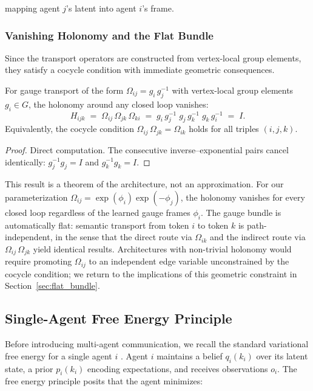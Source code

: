 \documentclass[twoside,11pt]{article}
\begin{document}
mapping agent $j$'s latent into agent $i$'s frame.

\subsubsection{Vanishing Holonomy and the Flat Bundle}
\label{sec:vanishing_holonomy}

Since the transport operators are constructed from vertex-local group elements, they satisfy a cocycle condition with immediate geometric consequences.

\begin{theorem}
\label{thm:vanishing_holonomy}
For gauge transport of the form $\Omega_{ij} = g_i\,g_j^{-1}$ with vertex-local group elements $g_i \in G$, the holonomy around any closed loop vanishes:
\begin{equation}
H_{ijk} \;=\; \Omega_{ij}\,\Omega_{jk}\,\Omega_{ki}
\;=\; g_i\,g_j^{-1}\;g_j\,g_k^{-1}\;g_k\,g_i^{-1}
\;=\; I.
\label{eq:holonomy}
\end{equation}
Equivalently, the cocycle condition $\Omega_{ij}\,\Omega_{jk} = \Omega_{ik}$ holds for all triples $(i,j,k)$.
\end{theorem}

\begin{proof}
Direct computation. The consecutive inverse--exponential pairs cancel identically: $g_j^{-1} g_j = I$ and $g_k^{-1} g_k = I$.
\end{proof}

This result is a theorem of the architecture, not an approximation. For our parameterization $\Omega_{ij} = \exp(\phi_i)\exp(-\phi_j)$, the holonomy vanishes for every closed loop regardless of the learned gauge frames $\phi_i$. The gauge bundle is automatically flat: semantic transport from token $i$ to token $k$ is path-independent, in the sense that the direct route via $\Omega_{ik}$ and the indirect route via $\Omega_{ij}\,\Omega_{jk}$ yield identical results. Architectures with non-trivial holonomy would require promoting $\Omega_{ij}$ to an independent edge variable unconstrained by the cocycle condition; we return to the implications of this geometric constraint in Section~\ref{sec:flat_bundle}.


\subsection{Single-Agent Free Energy Principle}

Before introducing multi-agent communication, we recall the standard variational free energy for a single agent $i$ \citep{friston2010free,parr2022active}. Agent $i$ maintains a belief $q_i(k_i)$ over its latent state, a prior $p_i(k_i)$ encoding expectations, and receives observations $o_i$. The free energy principle posits that the agent minimizes:
\end{document}
